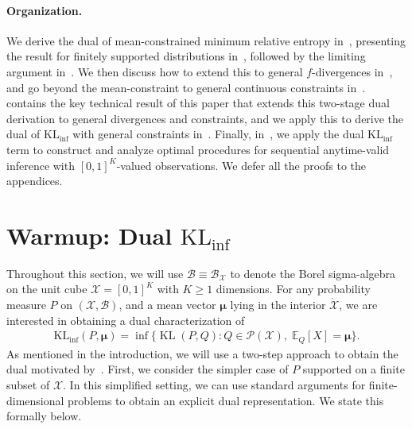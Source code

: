 \documentclass{article}
\theoremstyle{plain}
\theoremstyle{definition}
\newcommand{\KLinf}{\operatorname{KL_{inf}}}
\newcommand{\KL}{\operatorname{KL}}
\newcommand{\calP}{\mathcal P}
\newcommand{\calX}{\mathcal X}
\newcommand{\calB}{\mathcal B}
\newcommand{\boldmu}{\boldsymbol{\mu}}
\begin{document}
\paragraph{Organization.}  We derive the dual of mean-constrained minimum relative entropy in~, presenting the result for finitely supported distributions in~, followed by the limiting argument in~. We then discuss how to extend this to general $f$-divergences in~, and go beyond the mean-constraint to general continuous constraints in~. 
 contains the key technical result of this paper that extends this two-stage dual derivation to general divergences and constraints, and we apply this to derive the dual of $\KLinf$ with general constraints in~.  
Finally, in~, we apply the dual $\KLinf$ term to construct and analyze optimal procedures for sequential anytime-valid inference with $[0,1]^K$-valued observations. We defer all the proofs to the appendices. 

\section{Warmup: Dual $\KLinf$}
\label{sec:Klinf-mean-constrained}
Throughout this section, we will use $\calB \equiv \calB_\calX$ to denote the Borel sigma-algebra on the unit cube $\calX = [0,1]^K$ with $K \geq 1$ dimensions. For any probability measure $P$ on $(\calX, \calB)$, and a mean vector $\boldmu$ lying in the interior $\mathring{\calX}$, we are interested in obtaining a dual characterization of 
\begin{align}
    \KLinf(P, \boldmu) = \inf \{\KL(P, Q): Q \in \calP(\calX), \; \mathbb{E}_Q[X]=\boldmu\}. 
\end{align}
As mentioned in the introduction, we will use a two-step approach to obtain the dual motivated by~\citet{honda2010asymptotically}. First, we consider the simpler case of $P$ supported on a finite subset of $\calX$. In this simplified setting, we can use standard arguments for finite-dimensional problems to obtain an explicit dual representation. We state this formally below. 
\end{document}
